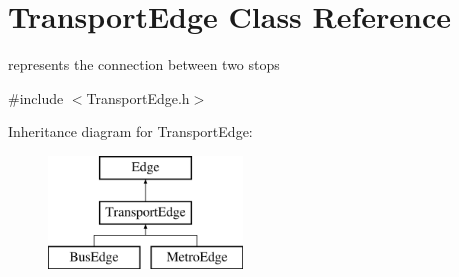 \hypertarget{class_transport_edge}{}\section{Transport\+Edge Class Reference}
\label{class_transport_edge}


represents the connection between two stops  




{\ttfamily \#include $<$Transport\+Edge.\+h$>$}

Inheritance diagram for Transport\+Edge\+:\begin{figure}[H]
\begin{center}
\leavevmode
\includegraphics[height=3.000000cm]{class_transport_edge}
\end{center}
\end{figure}
